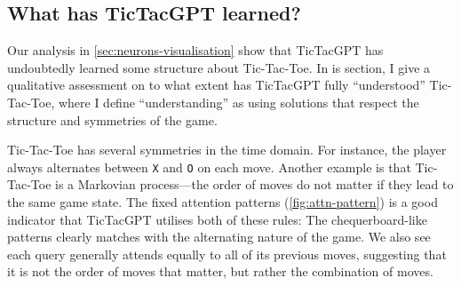 \documentclass{article}
\newcommand{\ttgpt}{TicTacGPT\xspace}
\newcommand{\ttt}{Tic-Tac-Toe\xspace}
\begin{document}



% 


\subsection{What has \ttgpt learned?}

Our analysis in \cref{sec:neurons-visualisation} show that \ttgpt has undoubtedly learned some structure about \ttt. In is section, I give a qualitative assessment on to what extent has \ttgpt fully ``understood'' \ttt, where I define ``understanding'' as using solutions that respect the structure and symmetries of the game.

\ttt has several symmetries in the time domain. For instance, the player always alternates between \texttt{X} and \texttt{O} on each move. Another example is that \ttt is a Markovian process---the order of moves do not matter if they lead to the same game state. The fixed attention patterns (\cref{fig:attn-pattern}) is a good indicator that \ttgpt utilises both of these rules: The chequerboard-like patterns clearly matches with the alternating nature of the game. We also see each query generally attends equally to all of its previous moves, suggesting that it is not the order of moves that matter, but rather the combination of moves.
\end{document}
